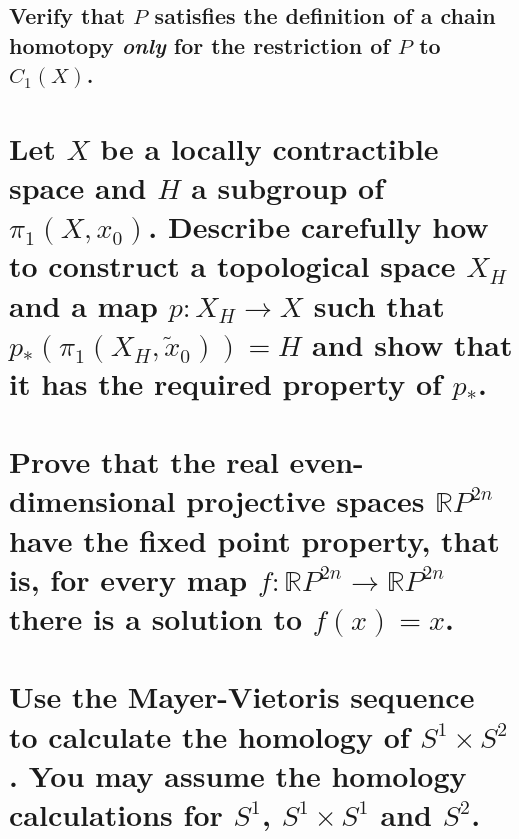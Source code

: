 \documentclass[10pt]{article}
\begin{document}
\subsection{Verify that $P$ satisfies the definition of a chain homotopy \emph{only} for the
  restriction of $P$ to $C_1(X)$.}

\section{Let $X$ be a locally contractible space and $H$ a subgroup of $\pi_1(X,x_0)$. Describe
  carefully how to construct a topological space $X_H$ and a map $p:X_H \to X$ such that
  $p_*(\pi_1(X_H,\tilde{x}_0))=H$ and show that it has the required property of
  $p_*$. }

\section{Prove that the real even-dimensional projective spaces $\mathbb{R}P^{2n}$ have the fixed
  point property, that is, for every map $f: \mathbb{R}P^{2n} \to \mathbb{R}P^{2n}$ there is a
  solution to $f(x) =x$. }

\section{Use the Mayer-Vietoris sequence to calculate the homology of $S^1 \times S^2$. You may
  assume the homology calculations for $S^1$, $S^1 \times S^1$ and $S^2$.}
\end{document}
